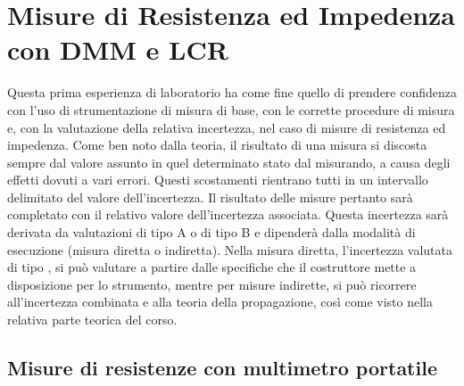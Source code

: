 \chapter{Misure di Resistenza ed Impedenza con DMM e LCR}
\label{chap:prima_prova}
Questa prima esperienza di laboratorio ha come fine quello di prendere confidenza con l’uso di strumentazione di misura di base, con le corrette procedure di misura e, con la valutazione della relativa incertezza, nel caso di misure di resistenza ed impedenza. Come ben noto dalla teoria, il risultato di una misura si discosta sempre dal valore assunto in quel determinato stato dal misurando, a causa degli effetti dovuti a vari errori. Questi scostamenti rientrano tutti in un intervallo delimitato del valore dell’incertezza.
Il risultato delle misure pertanto sar\`a completato con il relativo valore dell’incertezza associata. Questa incertezza sar\`a derivata da valutazioni di tipo A o di tipo B e dipender\`a dalla modalit\`a di esecuzione (misura diretta o indiretta). Nella misura diretta, l’incertezza valutata di tipo , si pu\`o valutare a partire dalle specifiche che il costruttore mette a disposizione per lo strumento, mentre per misure indirette, si pu\`o ricorrere all’incertezza combinata e alla teoria della propagazione, cos\`i come visto nella relativa parte teorica del corso.

\section{Misure di resistenze con multimetro portatile}
\label{sec:mult_port}


